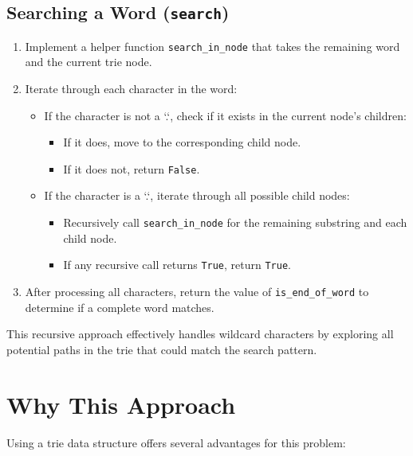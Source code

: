 \subsection*{Searching a Word (\texttt{search})}
\begin{enumerate}
    \item Implement a helper function \texttt{search\_in\_node} that takes the remaining word and the current trie node.
    \item Iterate through each character in the word:
    \begin{itemize}
        \item If the character is not a `.`, check if it exists in the current node's children:
        \begin{itemize}
            \item If it does, move to the corresponding child node.
            \item If it does not, return \texttt{False}.
        \end{itemize}
        \item If the character is a `.`, iterate through all possible child nodes:
        \begin{itemize}
            \item Recursively call \texttt{search\_in\_node} for the remaining substring and each child node.
            \item If any recursive call returns \texttt{True}, return \texttt{True}.
        \end{itemize}
    \end{itemize}
    \item After processing all characters, return the value of \texttt{is\_end\_of\_word} to determine if a complete word matches.
\end{enumerate}

This recursive approach effectively handles wildcard characters by exploring all potential paths in the trie that could match the search pattern.

\section*{Why This Approach}

Using a trie data structure offers several advantages for this problem:

